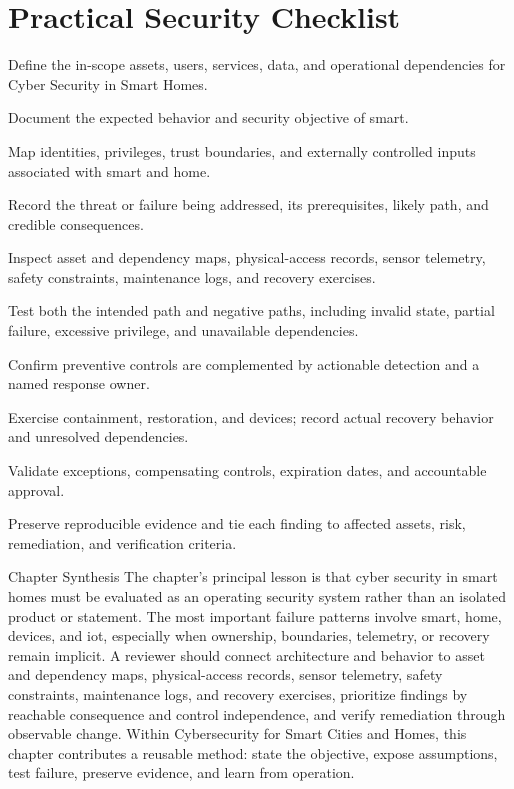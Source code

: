 \documentclass[11pt,letterpaper]{article}
\begin{document}
\section*{Practical Security Checklist}
\begin{CornellChecklist}
\item Define the in-scope assets, users, services, data, and operational dependencies for Cyber Security in Smart Homes.
\item Document the expected behavior and security objective of smart.
\item Map identities, privileges, trust boundaries, and externally controlled inputs associated with smart and home.
\item Record the threat or failure being addressed, its prerequisites, likely path, and credible consequences.
\item Inspect asset and dependency maps, physical-access records, sensor telemetry, safety constraints, maintenance logs, and recovery exercises.
\item Test both the intended path and negative paths, including invalid state, partial failure, excessive privilege, and unavailable dependencies.
\item Confirm preventive controls are complemented by actionable detection and a named response owner.
\item Exercise containment, restoration, and devices; record actual recovery behavior and unresolved dependencies.
\item Validate exceptions, compensating controls, expiration dates, and accountable approval.
\item Preserve reproducible evidence and tie each finding to affected assets, risk, remediation, and verification criteria.
\end{CornellChecklist}
\begin{CornellSummaryBox}{Chapter Synthesis}
The chapter's principal lesson is that cyber security in smart homes must be evaluated as an operating security system rather than an isolated product or statement. The most important failure patterns involve smart, home, devices, and iot, especially when ownership, boundaries, telemetry, or recovery remain implicit. A reviewer should connect architecture and behavior to asset and dependency maps, physical-access records, sensor telemetry, safety constraints, maintenance logs, and recovery exercises, prioritize findings by reachable consequence and control independence, and verify remediation through observable change. Within Cybersecurity for Smart Cities and Homes, this chapter contributes a reusable method: state the objective, expose assumptions, test failure, preserve evidence, and learn from operation.
\end{CornellSummaryBox}
\end{document}
